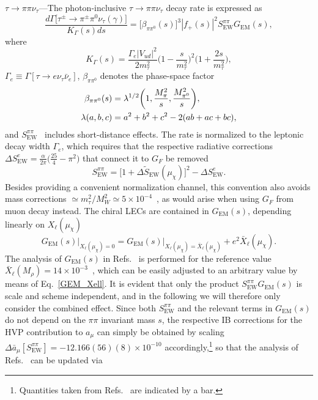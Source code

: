 \documentclass[prl,twocolumn,twoside,preprintnumbers,superscriptaddress,nofootinbib,letterpaper]{revtex4-1}
\newcommand{\mpi}{M_\pi}
\newcommand{\beq}{\begin{equation}}
\newcommand{\eeq}{\end{equation}}
\begin{document}
\emph{$\tau\to\pi\pi\nu_\tau$}---The photon-inclusive  $\tau\to\pi\pi\nu_\tau$ decay rate is expressed as
\begin{equation}
\frac{d\Gamma\big[\tau^\pm\to\pi^\pm\pi^0\nu_\tau(\gamma)\big]}{K_\Gamma(s)ds}=\big[\beta_{\pi\pi^0}(s)\big]^3|f_+(s)|^2 S_\text{EW}^{\pi\pi}G_\text{EM}(s),
\label{decay_rate}
\end{equation}
where
\beq
K_\Gamma(s)= \frac{\Gamma_e \vert V_{ud}\vert^2}{2 m_\tau^2} \bigg(1-\frac{s}{m_\tau^2}\bigg)^2\bigg(1+\frac{2s}{m_\tau^2}\bigg),
\eeq
$\Gamma_e\equiv \Gamma[\tau\to e\nu_\tau\bar{\nu}_e]$, $\beta_{\pi\pi^0}$ denotes the phase-space factor
\begin{align}
\beta_{\pi\pi^0}(s)&=\lambda^{1/2}\bigg(1,\frac{\mpi^2}{s},\frac{M_{\pi^0}^2}{s}\bigg),\notag\\ \lambda(a,b,c)&=a^2+b^2+c^2-2(ab+ac+bc),
\end{align}
and $S_\text{EW}^{\pi\pi}$~\cite{Sirlin:1981ie,Marciano:1985pd,Marciano:1988vm,Marciano:1993sh,Braaten:1990ef,Erler:2002mv,Davier:2002dy} includes short-distance effects.
The rate is normalized to
the leptonic decay width $\Gamma_e$, which requires that the respective radiative corrections $\Delta S_\text{EW}^e=\frac{\alpha}{2\pi}\big(\frac{25}{4}-\pi^2\big)$ that connect it to $G_F$ be removed
\beq
\label{SEW}
S^{\pi\pi}_\text{EW}= \big[1+\Delta\tilde S_\text{EW}(\mu_\chi)\big]^2-\Delta S_\text{EW}^{e}.
\eeq
Besides providing a convenient normalization channel, this convention also avoids mass corrections $\simeq m_\tau^2/M_W^2\simeq 5\times 10^{-4}$~\cite{Ferroglia:2013dga,Fael:2013pja}, as would arise when using $G_F$ from muon decay instead. The chiral LECs are contained in $G_\text{EM}(s)$, depending linearly on $X_\ell(\mu_\chi)$~\cite{Colangelo:2025ivq}
\beq
\label{GEM_Xell}
   G_\text{EM}(s)\big|_{X_\ell(\mu_\chi)=0}
= G_\text{EM}(s) \big|_{X_\ell(\mu_\chi) = \bar{X}_\ell(\mu_\chi)} + e^2 \bar{X}_\ell(\mu_\chi).
\eeq
The analysis of $G_\text{EM}(s)$ in
Refs.~\cite{Colangelo:2025iad,Colangelo:2025ivq} is performed for the reference value $\bar{X}_\ell(M_\rho)=14\times 10^{-3}$~\cite{Ma:2021azh}, which can be easily adjusted to an arbitrary value by means of Eq.~\eqref{GEM_Xell}. It is evident that only the product $S_\text{EW}^{\pi\pi}G_\text{EM}(s)$ is scale and scheme independent, and in the following we will therefore only consider the combined effect.
Since both $S_\text{EW}^{\pi\pi}$ and the relevant terms in $G_\text{EM}(s)$ do not depend on the $\pi\pi$ invariant mass $s$, the respective IB corrections for the HVP contribution to $a_\mu$ can simply be obtained by scaling $\Delta \bar a_\mu[S_\text{EW}^{\pi\pi}]=-12.166(56)(8)\times 10^{-10}$ accordingly,\footnote{Quantities taken from Refs.~\cite{Colangelo:2025iad,Colangelo:2025ivq} are indicated by a bar.} so that the analysis of Refs.~\cite{Colangelo:2025iad,Colangelo:2025ivq} can be updated via
\end{document}
